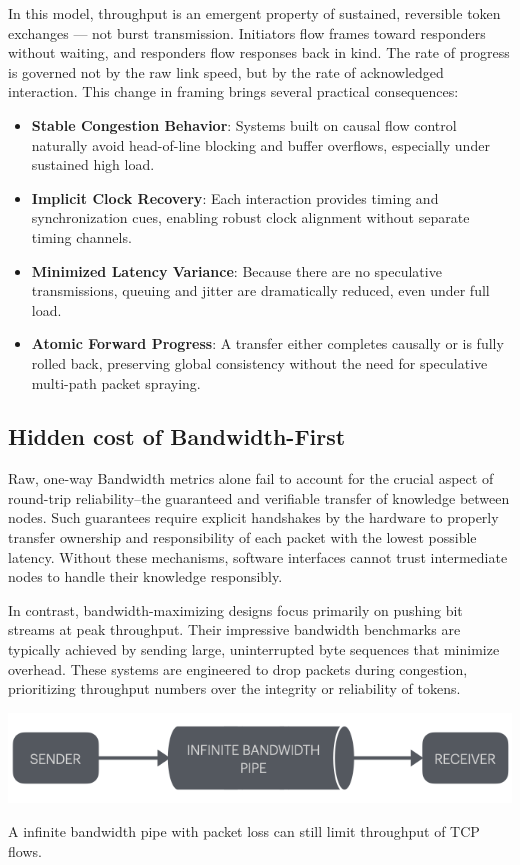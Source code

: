 \documentclass[../OAE-SPEC-MAIN.tex]{subfiles}
\begin{document}
In this model, throughput is an emergent property of sustained, reversible token exchanges — not burst transmission. Initiators flow frames toward responders without waiting, and responders flow responses back in kind. The rate of progress is governed not by the raw link speed, but by the rate of acknowledged interaction. This change in framing brings several practical consequences:
\begin{itemize}
\item \textbf{Stable Congestion Behavior}: Systems built on causal flow control naturally avoid head-of-line blocking and buffer overflows, especially under sustained high load.
\item \textbf{Implicit Clock Recovery}: Each interaction provides timing and synchronization cues, enabling robust clock alignment without separate timing channels.
\item \textbf{Minimized Latency Variance}: Because there are no speculative transmissions, queuing and jitter are dramatically reduced, even under full load.
\item \textbf{Atomic Forward Progress}: A transfer either completes causally or is fully rolled back, preserving global consistency without the need for speculative multi-path packet spraying.
\end{itemize}


\subsection{Hidden cost of Bandwidth-First}

Raw, one-way Bandwidth metrics alone fail to account for the crucial aspect of round-trip reliability--the guaranteed and verifiable transfer of knowledge between nodes. Such guarantees require explicit handshakes by the hardware to properly transfer ownership and responsibility of each packet with the lowest possible latency. Without these mechanisms, software interfaces cannot trust intermediate nodes to handle their knowledge responsibly.

In contrast, bandwidth-maximizing designs focus primarily on pushing bit streams at peak throughput. Their impressive bandwidth benchmarks are typically achieved by sending large, uninterrupted byte sequences that minimize overhead. These systems are engineered to drop packets during congestion, prioritizing throughput numbers over the integrity or reliability of tokens.

\begin{marginfigure}
  \includegraphics[width=\linewidth]{./figures/InfiniteBandwidthPipe.png}
  \caption{A infinite bandwidth pipe with packet loss can still limit throughput of TCP flows.}
  \label{fig:infinite_bandwidth}
\end{marginfigure}
\end{document}
